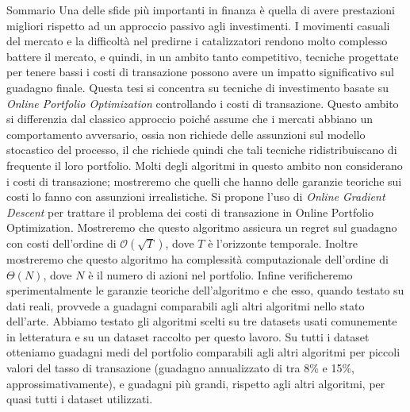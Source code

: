 \begin{poliabstract}{Sommario}
Una delle sfide più importanti in finanza è quella di avere prestazioni migliori rispetto ad un approccio passivo agli investimenti. I movimenti casuali del mercato e la difficoltà nel predirne i catalizzatori rendono molto complesso battere il mercato, e quindi, in un ambito tanto competitivo, tecniche progettate per tenere bassi i costi di transazione possono avere un impatto significativo sul guadagno finale. Questa tesi si concentra su tecniche di investimento basate su \emph{Online Portfolio Optimization} controllando i costi di transazione. Questo ambito si differenzia dal classico approccio poiché assume che i mercati abbiano un comportamento avversario, ossia non richiede delle assunzioni sul modello stocastico del processo, il che richiede quindi che tali tecniche ridistribuiscano di frequente il loro portfolio. Molti degli algoritmi in questo ambito non considerano i costi di transazione; mostreremo che quelli che hanno delle garanzie teoriche sui costi lo fanno con assunzioni irrealistiche. Si propone l'uso di \emph{Online Gradient Descent} per trattare il problema dei costi di transazione in Online Portfolio Optimization. Mostreremo che questo algoritmo assicura un regret sul guadagno con costi dell'ordine di $\mathcal O(\sqrt T)$, dove $T$ è l'orizzonte temporale. Inoltre mostreremo che questo algoritmo ha complessità computazionale dell'ordine di $\Theta(N)$, dove $N$ è il numero di azioni nel portfolio.
Infine verificheremo sperimentalmente le garanzie teoriche dell'algoritmo e che esso, quando testato su dati reali, provvede a guadagni comparabili agli altri algoritmi nello stato dell'arte. Abbiamo testato gli algoritmi scelti su tre datasets usati comunemente in letteratura e su un dataset raccolto per questo lavoro. Su tutti i dataset otteniamo guadagni medi del portfolio comparabili agli altri algoritmi per piccoli valori del tasso di transazione (guadagno annualizzato di tra 8\% e 15\%, approssimativamente), e guadagni più grandi, rispetto agli altri algoritmi, per quasi tutti i dataset utilizzati. 

\end{poliabstract}